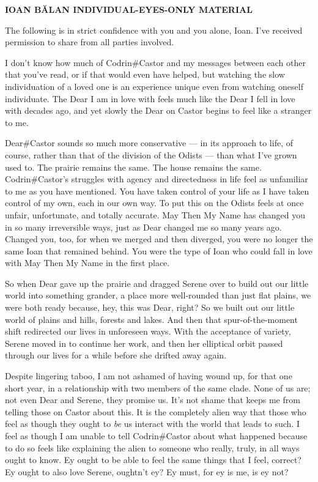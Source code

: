 \begin{center}
\textbf{IOAN BĂLAN INDIVIDUAL-EYES-ONLY MATERIAL}
\end{center}

The following is in strict confidence with you and you alone, Ioan. I've received permission to share from all parties involved.

I don't know how much of Codrin\#Castor and my messages between each other that you've read, or if that would even have helped, but watching the slow individuation of a loved one is an experience unique even from watching oneself individuate. The Dear I am in love with feels much like the Dear I fell in love with decades ago, and yet slowly the Dear on Castor begins to feel like a stranger to me.

Dear\#Castor sounds so much more conservative — in its approach to life, of course, rather than that of the division of the Odists — than what I've grown used to. The prairie remains the same. The house remains the same. Codrin\#Castor's struggles with agency and directedness in life feel as unfamiliar to me as you have mentioned. You have taken control of your life as I have taken control of my own, each in our own way. To put this on the Odists feels at once unfair, unfortunate, and totally accurate. May Then My Name has changed you in so many irreversible ways, just as Dear changed me so many years ago. Changed you, too, for when we merged and then diverged, you were no longer the same Ioan that remained behind. You were the type of Ioan who could fall in love with May Then My Name in the first place.

So when Dear gave up the prairie and dragged Serene over to build out our little world into something grander, a place more well-rounded than just flat plains, we were both ready because, hey, this was Dear, right? So we built out our little world of plains and hills, forests and lakes. And then that spur-of-the-moment shift redirected our lives in unforeseen ways. With the acceptance of variety, Serene moved in to continue her work, and then her elliptical orbit passed through our lives for a while before she drifted away again.

Despite lingering taboo, I am not ashamed of having wound up, for that one short year, in a relationship with two members of the same clade. None of us are; not even Dear and Serene, they promise us. It's not shame that keeps me from telling those on Castor about this. It is the completely alien way that those who feel as though they ought to \emph{be} us interact with the world that leads to such. I feel as though I am unable to tell Codrin\#Castor about what happened because to do so feels like explaining the alien to someone who really, truly, in all ways ought to know. Ey ought to be able to feel the same things that I feel, correct? Ey ought to also love Serene, oughtn't ey? Ey must, for ey is me, is ey not?

